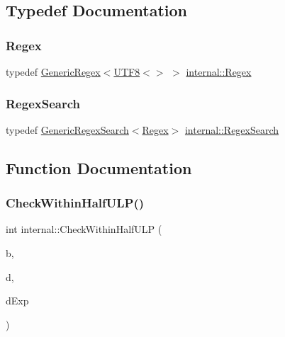 \subsection{Typedef Documentation}
\mbox{\label{namespaceinternal_ae7fc20c6ee680ae3ba16ae16b4bd5e16}} 
\subsubsection{\texorpdfstring{Regex}{Regex}}
{\footnotesize\ttfamily typedef \hyperlink{classinternal_1_1GenericRegex}{Generic\+Regex}$<$\hyperlink{structUTF8}{U\+T\+F8}$<$$>$ $>$ \hyperlink{namespaceinternal_ae7fc20c6ee680ae3ba16ae16b4bd5e16}{internal\+::\+Regex}}

\mbox{\label{namespaceinternal_a7101e324c2d06f1505ef7c7d4401392b}} 
\subsubsection{\texorpdfstring{Regex\+Search}{RegexSearch}}
{\footnotesize\ttfamily typedef \hyperlink{classinternal_1_1GenericRegexSearch}{Generic\+Regex\+Search}$<$\hyperlink{namespaceinternal_ae7fc20c6ee680ae3ba16ae16b4bd5e16}{Regex}$>$ \hyperlink{namespaceinternal_a7101e324c2d06f1505ef7c7d4401392b}{internal\+::\+Regex\+Search}}



\subsection{Function Documentation}
\mbox{\label{namespaceinternal_a190f9c286df64526a7e3550528ed6b02}} 
\subsubsection{\texorpdfstring{Check\+Within\+Half\+U\+L\+P()}{CheckWithinHalfULP()}}
{\footnotesize\ttfamily int internal\+::\+Check\+Within\+Half\+U\+LP (\begin{DoxyParamCaption}\item[{double}]{b,  }\item[{const \hyperlink{classinternal_1_1BigInteger}{Big\+Integer} \&}]{d,  }\item[{int}]{d\+Exp }\end{DoxyParamCaption})\hspace{0.3cm}{\ttfamily [inline]}}

